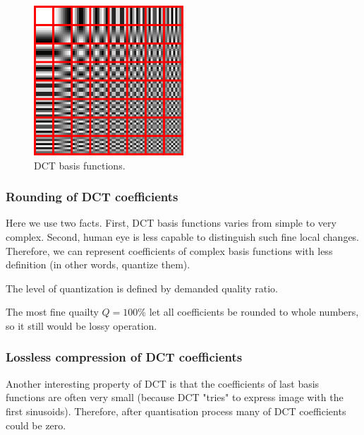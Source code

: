 \begin{figure}
\centerline{\includegraphics[width=0.5\textwidth]{images/Dctjpeg.png}}
\caption[DCT basis functions (Public domain)]{DCT basis functions.}
\label{img:DCTbf}
\end{figure}



\subsubsection{Rounding of DCT coefficients}

Here we use two facts. First, DCT basis functions varies from simple
to very complex. Second, human eye is less capable to distinguish such
fine local changes. Therefore, we can represent coefficients of complex
basis functions with less definition (in other words, quantize them).

The level of quantization is defined by demanded quality ratio.

The most fine quailty $Q=100\%$ let all coefficients be rounded to whole numbers,
so it still would be lossy operation.

\subsubsection{Lossless compression of DCT coefficients}

Another interesting property of DCT is that the coefficients
of last basis functions are often very small (because DCT "tries"
to express image with the first sinusoids). Therefore, after
quantisation process many of DCT coefficients could be zero.

